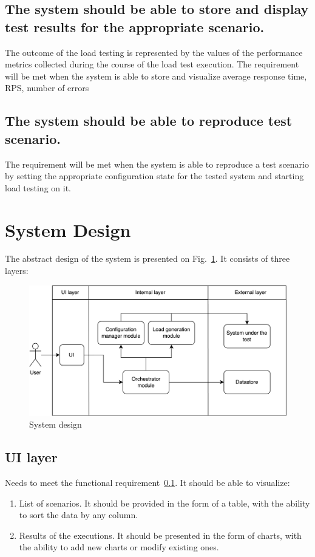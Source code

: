 \subsection{The system should be able to store and display test results for the appropriate scenario.}\label{subsec:fr:store_results}
The outcome of the load testing is represented by the values of the performance metrics collected during the course of the load test execution.
The requirement will be met when the system is able to store and visualize average response time, RPS, number of errors

\subsection{The system should be able to reproduce test scenario.}\label{subsec:fr:reproduce}
The requirement will be met when the system is able to reproduce a test scenario by setting the appropriate configuration state for the tested system and starting load testing on it.


\section{System Design}\label{sec:system_design}
The abstract design of the system is presented on Fig.~\ref{fig:design}. It consists of three layers:

\begin{figure}[t]
    \centering
    \includegraphics[height=\textheight,width=\textwidth,keepaspectratio]{design.png}
    \caption{System design}
    \label{fig:design}
\end{figure}

\subsection{UI layer}\label{subsec:ui_layer}
Needs to meet the functional requirement~\ref{subsec:fr:store_results}.
It should be able to visualize:
\begin{enumerate}
    \item List of scenarios. It should be provided in the form of a table, with the ability to sort the data by any column.
    \item Results of the executions. It should be presented in the form of charts, with the ability to add new charts or modify existing ones.
\end{enumerate}

